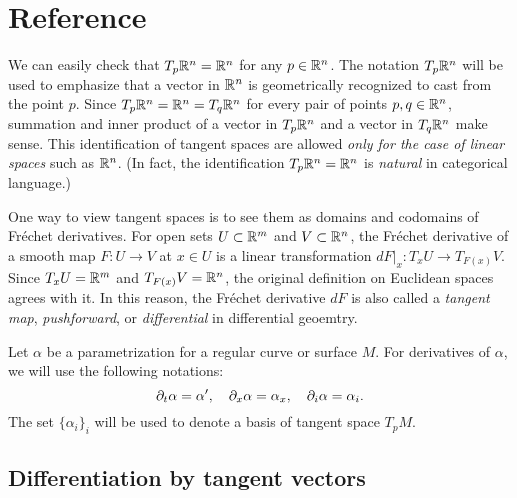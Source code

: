 \documentclass{../note}
\def\a{\alpha}
\begin{document}







\chapter*{Reference}

\begin{rmk}
We can easily check that $T_p\mathbb{R}^n=\mathbb{R}^n$ for any $p\in\mathbb{R}^n$.
The notation $T_p\mathbb{R}^n$ will be used to emphasize that a vector in $\mathbb{R}^n$ is geometrically recognized to cast from the point $p$.
Since $T_p\mathbb{R}^n=\mathbb{R}^n=T_q\mathbb{R}^n$ for every pair of points $p,q\in\mathbb{R}^n$, summation and inner product of a vector in $T_p\mathbb{R}^n$ and a vector in $T_q\mathbb{R}^n$ make sense.
This identification of tangent spaces are allowed \emph{only for the case of linear spaces} such as $\mathbb{R}^n$.
(In fact, the identification $T_p\mathbb{R}^n=\mathbb{R}^n$ is \emph{natural} in categorical language.)
\end{rmk}
\begin{rmk}
One way to view tangent spaces is to see them as domains and codomains of Fr\'echet derivatives.
For open sets $U\subset\mathbb{R}^m$ and $V\subset\mathbb{R}^n$, the Fr\'echet derivative of a smooth map $F:U\to V$ at $x\in U$ is a linear transformation $dF|_x:T_xU\to T_{F(x)}V$.
Since $T_xU=\mathbb{R}^m$ and $T_{F(x)}V=\mathbb{R}^n$, the original definition on Euclidean spaces agrees with it.
In this reason, the Fr\'echet derivative $dF$ is also called a \emph{tangent map}, \emph{pushforward}, or \emph{differential} in differential geoemtry.
\end{rmk}


\begin{notn*}
Let $\a$ be a parametrization for a regular curve or surface $M$.
For derivatives of $\a$, we will use the following notations:
\[\pd_t\a=\a',\quad\pd_x\a=\a_x,\quad\pd_i\a=\a_i.\]
The set $\{\a_i\}_i$ will be used to denote a basis of tangent space $T_pM$.
\end{notn*}





\section{Differentiation by tangent vectors}

\end{document}
